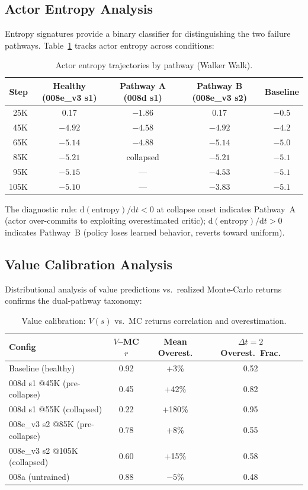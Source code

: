 \documentclass[10pt,letterpaper]{article}
\begin{document}
\subsection{Actor Entropy Analysis}
\label{sec:entropy}

Entropy signatures provide a binary classifier for distinguishing the two failure pathways. Table~\ref{tab:entropy} tracks actor entropy across conditions:

\begin{table}[h]
\centering
\caption{Actor entropy trajectories by pathway (Walker Walk).}
\label{tab:entropy}
\begin{tabular}{rcccc}
\toprule
Step & Healthy (008e\_v3 s1) & Pathway A (008d s1) & Pathway B (008e\_v3 s2) & Baseline \\
\midrule
25K  & 0.17  & $-1.86$ & 0.17  & $-0.5$ \\
45K  & $-4.92$ & $-4.58$ & $-4.92$ & $-4.2$ \\
65K  & $-5.14$ & $-4.88$ & $-5.14$ & $-5.0$ \\
85K  & $-5.21$ & collapsed & $-5.21$ & $-5.1$ \\
95K  & $-5.15$ & --- & $-4.53$ & $-5.1$ \\
105K & $-5.10$ & --- & $-3.83$ & $-5.1$ \\
\bottomrule
\end{tabular}
\end{table}

The diagnostic rule: $\mathrm{d}(\text{entropy})/\mathrm{d}t < 0$ at collapse onset indicates Pathway~A (actor over-commits to exploiting overestimated critic); $\mathrm{d}(\text{entropy})/\mathrm{d}t > 0$ indicates Pathway~B (policy loses learned behavior, reverts toward uniform).

\subsection{Value Calibration Analysis}
\label{sec:value_calibration}

Distributional analysis of value predictions vs.\ realized Monte-Carlo returns confirms the dual-pathway taxonomy:

\begin{table}[h]
\centering
\caption{Value calibration: $V(s)$ vs.\ MC returns correlation and overestimation.}
\label{tab:value_calibration}
\begin{tabular}{lcccc}
\toprule
Config & $V$--MC $r$ & Mean Overest. & $\Delta t{=}2$ Overest.\ Frac. \\
\midrule
Baseline (healthy) & 0.92 & +3\% & 0.52 \\
008d s1 @45K (pre-collapse) & 0.45 & +42\% & 0.82 \\
008d s1 @55K (collapsed) & 0.22 & +180\% & 0.95 \\
008e\_v3 s2 @85K (pre-collapse) & 0.78 & +8\% & 0.55 \\
008e\_v3 s2 @105K (collapsed) & 0.60 & +15\% & 0.58 \\
008a (untrained) & 0.88 & $-5$\% & 0.48 \\
\bottomrule
\end{tabular}
\end{table}
\end{document}
